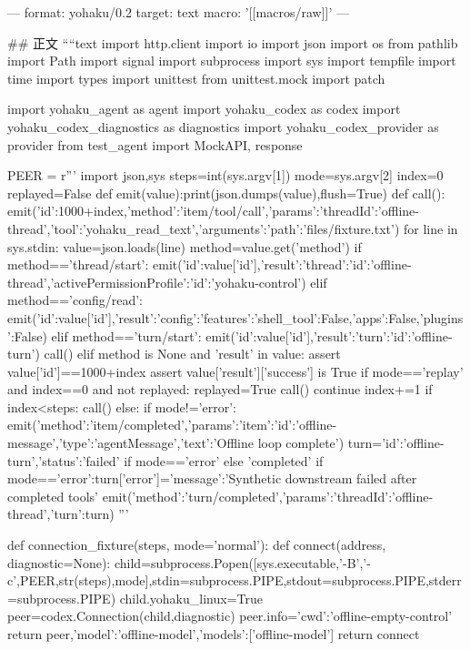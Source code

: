 ---
format: yohaku/0.2
target: text
macro: '[[macros/raw]]'
---

## 正文
````text
import http.client
import io
import json
import os
from pathlib import Path
import signal
import subprocess
import sys
import tempfile
import time
import types
import unittest
from unittest.mock import patch

import yohaku_agent as agent
import yohaku_codex as codex
import yohaku_codex_diagnostics as diagnostics
import yohaku_codex_provider as provider
from test_agent import MockAPI, response


PEER = r'''
import json,sys
steps=int(sys.argv[1])
mode=sys.argv[2]
index=0
replayed=False
def emit(value):print(json.dumps(value),flush=True)
def call():
    emit({'id':1000+index,'method':'item/tool/call','params':{'threadId':'offline-thread','tool':'yohaku_read_text','arguments':{'path':'files/fixture.txt'}}})
for line in sys.stdin:
    value=json.loads(line)
    method=value.get('method')
    if method=='thread/start':
        emit({'id':value['id'],'result':{'thread':{'id':'offline-thread'},'activePermissionProfile':{'id':'yohaku-control'}}})
    elif method=='config/read':
        emit({'id':value['id'],'result':{'config':{'features':{'shell_tool':False,'apps':False,'plugins':False}}}})
    elif method=='turn/start':
        emit({'id':value['id'],'result':{'turn':{'id':'offline-turn'}}})
        call()
    elif method is None and 'result' in value:
        assert value['id']==1000+index
        assert value['result']['success'] is True
        if mode=='replay' and index==0 and not replayed:
            replayed=True
            call()
            continue
        index+=1
        if index<steps:
            call()
        else:
            if mode!='error':
                emit({'method':'item/completed','params':{'item':{'id':'offline-message','type':'agentMessage','text':'Offline loop complete'}}})
            turn={'id':'offline-turn','status':'failed' if mode=='error' else 'completed'}
            if mode=='error':turn['error']={'message':'Synthetic downstream failed after completed tools'}
            emit({'method':'turn/completed','params':{'threadId':'offline-thread','turn':turn}})
'''


def connection_fixture(steps, mode='normal'):
    def connect(address, diagnostic=None):
        child=subprocess.Popen([sys.executable,'-B','-c',PEER,str(steps),mode],stdin=subprocess.PIPE,stdout=subprocess.PIPE,stderr=subprocess.PIPE)
        child.yohaku_linux=True
        peer=codex.Connection(child,diagnostic)
        peer.info={'cwd':'offline-empty-control'}
        return peer,{'model':'offline-model','models':['offline-model']}
    return connect


